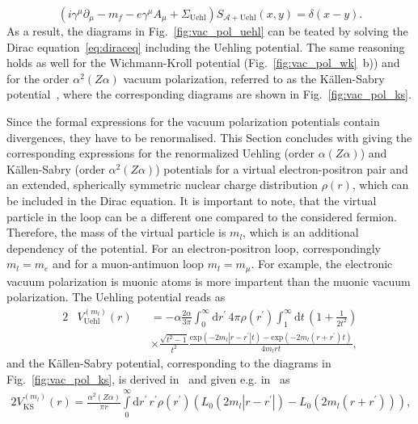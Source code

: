 \begin{equation}
\left(i\gamma^\mu \partial_\mu -m_f - e \gamma^\mu A_\mu + \Sigma_{\text{Uehl}}\right)S_{\mathcal{A}+\text{Uehl}}(x,y)=\delta(x-y).
\label{eq:uehlprop}
\end{equation}
As a result, the diagrams in Fig.~\ref{fig:vac_pol_uehl} can be teated by solving the Dirac equation~\eqref{eq:diraceq} including the Uehling potential. The same reasoning holds as well for the Wichmann-Kroll potential (Fig.~\ref{fig:vac_pol_wk}~b)) and for the order $\alpha^2(Z\alpha)$ vacuum polarization, referred to as the Källen-Sabry potential~\cite{kallen1955}, where the corresponding diagrams are shown in Fig.~\ref{fig:vac_pol_ks}. 

Since the formal expressions for the vacuum polarization potentials contain divergences, they have to be renormalised. This Section concludes with giving the corresponding expressions for the renormalized Uehling (order $\alpha(Z\alpha)$) and Källen-Sabry (order $\alpha^2(Z\alpha)$) potentials for a virtual electron-positron pair and an extended, spherically symmetric nuclear charge distribution $\rho(r)$, which can be included in the Dirac equation. It is important to note, that the virtual particle in the loop can be a different one compared to the considered fermion. Therefore, the mass of the virtual particle is $m_l$, which is an additional dependency of the potential. For an electron-positron loop, correspondingly $m_l=m_e$ and for a muon-antimuon loop $m_l=m_\mu$. For example, the electronic vacuum polarization is muonic atoms is more impartent than the muonic vacuum polarization. The Uehling potential reads as~\cite{Fullerton1976,Elizarov2005}
\begin{alignat}{2}
&V^{(m_l)}_{\text{Uehl}}(r)&&=-\alpha \frac{2\alpha}{3\pi}\int_0^\infty \text{d}r^{\prime}\,4\pi \rho(r^\prime)\int_1^\infty \text{d}t\,\left( 1+\frac{1}{2t^2} \right)\nonumber\\[7.5pt]
&&&\times\frac{\sqrt{t^2-1}}{t^2} \frac{\text{exp}(-2m_l|r-r^\prime|t)-\text{exp}(-2m_l(r+r^\prime)t)}{4m_lr t},
\label{eq:uehlPot}
\end{alignat}
and the Källen-Sabry potential, corresponding to the diagrams in Fig.~\ref{fig:vac_pol_ks}, is derived in~\cite{Barbieri1970,Barbieri1972,Barbieri1972_2,Barbieri1973} and given e.g. in~\cite{indelicato2013,Fullerton1976} as
\begin{alignat}{2}
V^{(m_l)}_{\text{KS}}(r)=\frac{\alpha^2(Z\alpha)}{\pi r}\int\limits_0^\infty\text{d}r^\prime\,r^\prime \rho(r^\prime)\left( L_0(2m_l|r-r^\prime|)-L_0(2m_l(r+r^\prime))\right),\label{eq:KSPot}
\end{alignat}

